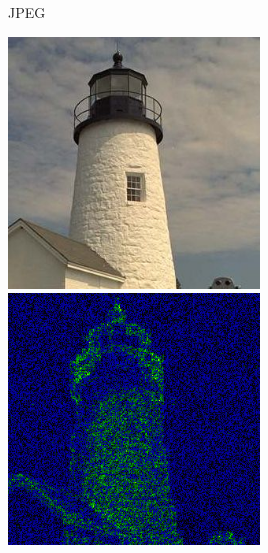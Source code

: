 \documentclass{beamer}
\begin{document}
  \begin{frame}{JPEG}
    \begin{multicols}{2}
      \includegraphics[width=0.5\textwidth]{figure/JPEG_lighthouse050.jpg}
      \includegraphics[width=0.5\textwidth]{figure/psnr_JPEG_lighthouse050.png}
    \end{multicols}
  \end{frame}
\end{document}
